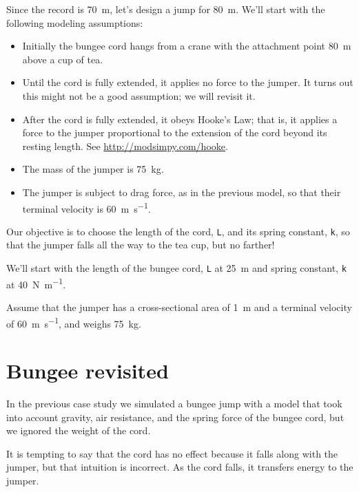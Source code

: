 \documentclass[
]{book}
\numberwithin{Answer}{chapter}
\numberwithin{Exercise}{chapter}
\begin{document}
Since the record is \SI{70}{\meter}, let's design a jump for \SI{80}{\meter}.  We'll start with the following modeling assumptions:

\begin{itemize}

\item  Initially the bungee cord hangs from a crane with the attachment point \SI{80}{\meter} above a cup of tea.

\item Until the cord is fully extended, it applies no force to the jumper.  It turns out this might not be a good assumption; we will revisit it.

\item After the cord is fully extended, it obeys Hooke's Law; that is, it applies a force to the jumper proportional to the extension of the cord beyond its resting length.  See \url{http://modsimpy.com/hooke}. 

\item The mass of the jumper is \SI{75}{\kilogram}.

\item The jumper is subject to drag force, as in the previous model, so that their terminal velocity is \SI{60}{\meter \per \second}.

\end{itemize}

Our objective is to choose the length of the cord, {\tt L}, and its spring constant, {\tt k}, so that the jumper falls all the way to the tea cup, but no farther!

We'll start with the length of the bungee cord, {\tt L} at \SI{25}{\meter} and spring constant, {\tt k} at \SI{40}{\newton \per \meter}.

Assume that the jumper has a cross-sectional area of \SI{1}{\meter} and a terminal velocity of \SI{60}{\meter\per\second}, and weighs \SI{75}{\kilogram}.


\section{Bungee revisited}

In the previous case study we simulated a bungee jump with a model that took into account gravity, air resistance, and the spring force of the bungee cord, but we ignored the weight of the cord.


It is tempting to say that the cord has no effect because it falls along with the jumper, but that intuition is incorrect.  As the cord falls, it transfers energy to the jumper.
\end{document}
